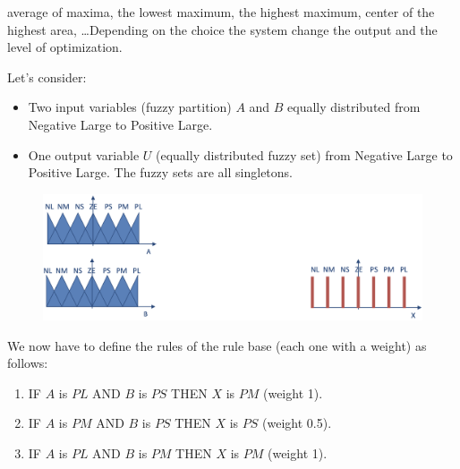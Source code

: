 \documentclass[12pt, a4paper]{report}
\newtheorem[L]{theorem}{Theorem}
\newtheorem[M]{corollary}{Corollary}
\newtheorem[M]{lemma}{Lemma}
\newtheorem[style=S,bodystyle=\normalfont]{definition}{Definition}
\begin{document}
    average of maxima, the lowest maximum, the highest maximum, center of the highest area, \dots Depending on the choice the system change the 
    output and the level of optimization. 
    \begin{example}
        Let's consider:
        \begin{itemize}
            \item Two input variables (fuzzy partition) $A$ and $B$ equally distributed from Negative Large to Positive Large. 
            \item One output variable $U$ (equally distributed fuzzy set) from Negative Large to Positive Large. The fuzzy sets are all singletons.
        \end{itemize} 
        \begin{figure}[H]
            \centering
            \includegraphics[width=0.75\linewidth]{images/rules.png}
        \end{figure}
        We now have to define the rules of the rule base (each one with a weight) as follows: 
        \begin{enumerate}
            \item IF $A$ is $PL$ AND $B$ is $PS$ THEN $X$ is $PM$ (weight 1).
            \item IF $A$ is $PM$ AND $B$ is $PS$ THEN $X$ is $PS$ (weight 0.5).
            \item IF $A$ is $PL$ AND $B$ is $PM$ THEN $X$ is $PM$ (weight 1).
        \end{enumerate}


\end{example}
\end{document}
